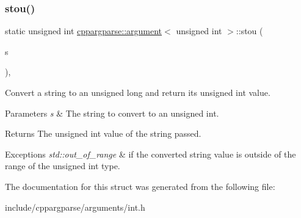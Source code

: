 \subsubsection{\texorpdfstring{stou()}{stou()}}
{\footnotesize\ttfamily static unsigned int \hyperlink{structcppargparse_1_1argument}{cppargparse\+::argument}$<$ unsigned int $>$\+::stou (\begin{DoxyParamCaption}\item[{const std\+::string \&}]{s }\end{DoxyParamCaption})\hspace{0.3cm}{\ttfamily [inline]}, {\ttfamily [static]}}



Convert a string to an unsigned long and return its unsigned int value. 


\begin{DoxyParams}{Parameters}
{\em s} & The string to convert to an unsigned int.\\
\hline
\end{DoxyParams}
\begin{DoxyReturn}{Returns}
The unsigned int value of the string passed. 
\end{DoxyReturn}

\begin{DoxyExceptions}{Exceptions}
{\em std\+::out\+\_\+of\+\_\+range} & if the converted string value is outside of the range of the unsigned int type. \\
\hline
\end{DoxyExceptions}


The documentation for this struct was generated from the following file\+:\begin{DoxyCompactItemize}
\item 
include/cppargparse/arguments/int.\+h\end{DoxyCompactItemize}
